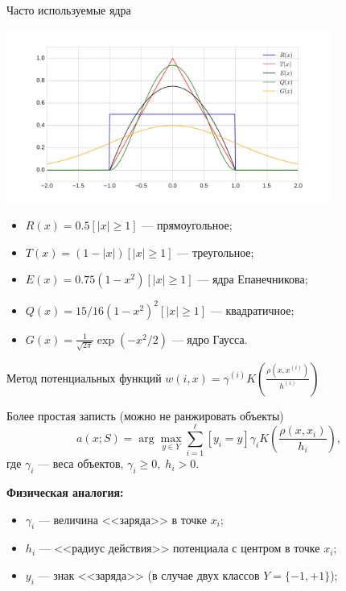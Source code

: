 \documentclass{beamer}
\begin{document}
\begin{frame}{Часто используемые ядра}
\begin{center}
\includegraphics[width=0.8\textwidth]{../fig/cores.pdf}
\end{center}
\begin{itemize}
    \item[] $R(x) = 0.5[|x| \ge 1]$ --- прямоугольное;
    \item[] $T(x) = (1 - |x|)[|x| \ge 1]$ --- треугольное;
    \item[] $E(x) = 0.75(1-x^2)[|x| \ge 1]$ --- ядра Епанечникова;
    \item[] $Q(x) = 15/16(1-x^2)^2[|x| \ge 1]$ --- квадратичное;
    \item[] $G(x) = \frac{1}{\sqrt{2\pi}}\exp\left(-x^2/2\right)$ --- ядро Гаусса.
\end{itemize}
\end{frame}
\begin{frame}{Метод потенциальных функций}
$w(i, x) = \gamma^{(i)}K\left(\frac{\rho(x,x^{(i)})}{h^{(i)}}\right)$

Более простая записть (можно не ранжировать объекты)
$$
a(x; S) = \arg\max_{y \in Y}\sum\limits_{i=1}^{\ell}[y_i=y]\gamma_iK\left(\frac{\rho(x, x_i)}{h_i}\right),
$$
где $\gamma_i$ --- веса объектов, $\gamma_i \ge 0,\;h_i>0$.

{\bf Физическая аналогия:}
\begin{itemize}
    \item[] $\gamma_i$ --- величина <<заряда>> в точке $x_i$;
    \item[] $h_i$ --- <<радиус действия>> потенциала с центром в точке $x_i$;
    \item[] $y_i$ --- знак <<заряда>> (в случае двух классов $Y = \{-1, +1\}$);
\end{itemize}
\end{frame}
\end{document}
